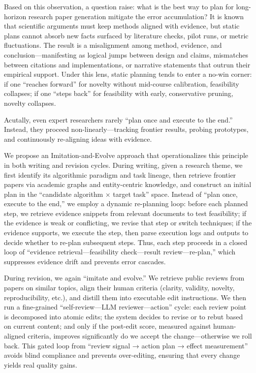 \documentclass[manuscript,review,anonymous]{acmart}
\begin{document}
Based on this observation, a question raise: what is the best way to plan for long-horizon research paper generation mitigate the error accumulation?  It is known that scientific arguments must keep methods aligned with evidence, but static plans cannot absorb new facts surfaced by literature checks, pilot runs, or metric fluctuations. The result is a misalignment among method, evidence, and conclusion—manifesting as logical jumps between design and claims, mismatches between citations and implementations, or narrative statements that outrun their empirical support. Under this lens, static planning tends to enter a no-win corner: if one “reaches forward” for novelty without mid-course calibration, feasibility collapses; if one “steps back” for feasibility with early, conservative pruning, novelty collapses.

Acutally, even expert researchers rarely “plan once and execute to the end.” Instead, they proceed non-linearly—tracking frontier results, probing prototypes, and continuously re-aligning ideas with evidence. 

We propose an Imitation-and-Evolve approach that operationalizes this principle in both writing and revision cycles. During writing, given a research theme, we first identify its algorithmic paradigm and task lineage, then retrieve frontier papers via academic graphs and entity-centric knowledge, and construct an initial plan in the “candidate algorithm × target task” space. Instead of “plan once, execute to the end,” we employ a dynamic re-planning loop: before each planned step, we retrieve evidence snippets from relevant documents to test feasibility; if the evidence is weak or conflicting, we revise that step or switch techniques; if the evidence supports, we execute the step, then parse execution logs and outputs to decide whether to re-plan subsequent steps. Thus, each step proceeds in a closed loop of “evidence retrieval—feasibility check—result review—re-plan,” which suppresses evidence drift and prevents error cascades.

During revision, we again “imitate and evolve.” We retrieve public reviews from papers on similar topics, align their human criteria (clarity, validity, novelty, reproducibility, etc.), and distill them into executable edit instructions. We then run a fine-grained “self-review—LLM reviewer—action” cycle: each review point is decomposed into atomic edits; the system decides to revise or to rebut based on current content; and only if the post-edit score, measured against human-aligned criteria, improves significantly do we accept the change—otherwise we roll back. This gated loop from “review signal → action plan → effect measurement” avoids blind compliance and prevents over-editing, ensuring that every change yields real quality gains.
\end{document}
